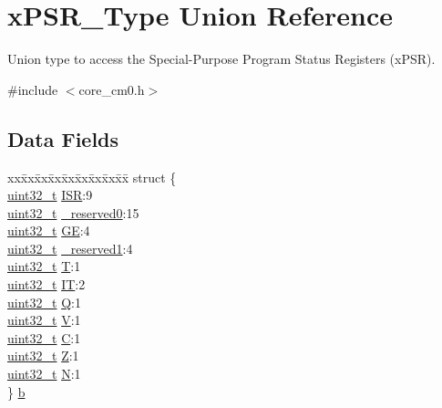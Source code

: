 \hypertarget{unionx_p_s_r___type}{\section{x\-P\-S\-R\-\_\-\-Type Union Reference}
\label{unionx_p_s_r___type}
}


Union type to access the Special-\/\-Purpose Program Status Registers (x\-P\-S\-R).  




{\ttfamily \#include $<$core\-\_\-cm0.\-h$>$}

\subsection*{Data Fields}
\begin{DoxyCompactItemize}
\item 
\begin{tabbing}
xx\=xx\=xx\=xx\=xx\=xx\=xx\=xx\=xx\=\kill
struct \{\\
\>\hyperlink{stdint_8h_a435d1572bf3f880d55459d9805097f62}{uint32\_t} \hyperlink{unionx_p_s_r___type_a3e9120dcf1a829fc8d2302b4d0673970}{ISR}:9\\
\>\hyperlink{stdint_8h_a435d1572bf3f880d55459d9805097f62}{uint32\_t} \hyperlink{unionx_p_s_r___type_af438e0f407357e914a70b5bd4d6a97c5}{\_reserved0}:15\\
\>\hyperlink{stdint_8h_a435d1572bf3f880d55459d9805097f62}{uint32\_t} \hyperlink{unionx_p_s_r___type_a2d0ec4ccae337c1df5658f8cf4632e76}{GE}:4\\
\>\hyperlink{stdint_8h_a435d1572bf3f880d55459d9805097f62}{uint32\_t} \hyperlink{unionx_p_s_r___type_a790056bb6f20ea16cecc784b0dd19ad6}{\_reserved1}:4\\
\>\hyperlink{stdint_8h_a435d1572bf3f880d55459d9805097f62}{uint32\_t} \hyperlink{unionx_p_s_r___type_a7eed9fe24ae8d354cd76ae1c1110a658}{T}:1\\
\>\hyperlink{stdint_8h_a435d1572bf3f880d55459d9805097f62}{uint32\_t} \hyperlink{unionx_p_s_r___type_a3200966922a194d84425e2807a7f1328}{IT}:2\\
\>\hyperlink{stdint_8h_a435d1572bf3f880d55459d9805097f62}{uint32\_t} \hyperlink{unionx_p_s_r___type_add7cbd2b0abd8954d62cd7831796ac7c}{Q}:1\\
\>\hyperlink{stdint_8h_a435d1572bf3f880d55459d9805097f62}{uint32\_t} \hyperlink{unionx_p_s_r___type_af14df16ea0690070c45b95f2116b7a0a}{V}:1\\
\>\hyperlink{stdint_8h_a435d1572bf3f880d55459d9805097f62}{uint32\_t} \hyperlink{unionx_p_s_r___type_a40213a6b5620410cac83b0d89564609d}{C}:1\\
\>\hyperlink{stdint_8h_a435d1572bf3f880d55459d9805097f62}{uint32\_t} \hyperlink{unionx_p_s_r___type_a1e5d9801013d5146f2e02d9b7b3da562}{Z}:1\\
\>\hyperlink{stdint_8h_a435d1572bf3f880d55459d9805097f62}{uint32\_t} \hyperlink{unionx_p_s_r___type_a2db9a52f6d42809627d1a7a607c5dbc5}{N}:1\\
\} \hyperlink{unionx_p_s_r___type_a42867881c11d9d77ff171fff21744af7}{b}\\


\end{tabbing}
\end{DoxyCompactItemize}
